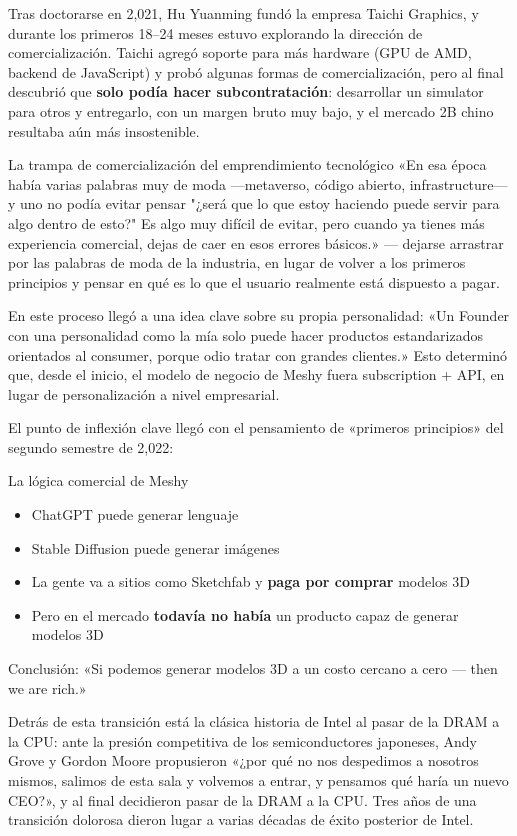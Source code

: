\documentclass[a4paper]{article}
\begin{document}
Tras doctorarse en 2,021, Hu Yuanming fundó la empresa Taichi Graphics, y durante los primeros 18--24 meses estuvo explorando la dirección de comercialización. Taichi agregó soporte para más hardware (GPU de AMD, backend de JavaScript) y probó algunas formas de comercialización, pero al final descubrió que \textbf{solo podía hacer subcontratación}: desarrollar un simulator para otros y entregarlo, con un margen bruto muy bajo, y el mercado 2B chino resultaba aún más insostenible.

\begin{warningbox}{La trampa de comercialización del emprendimiento tecnológico}
«En esa época había varias palabras muy de moda —metaverso, código abierto, infrastructure— y uno no podía evitar pensar "¿será que lo que estoy haciendo puede servir para algo dentro de esto?" Es algo muy difícil de evitar, pero cuando ya tienes más experiencia comercial, dejas de caer en esos errores básicos.» — dejarse arrastrar por las palabras de moda de la industria, en lugar de volver a los primeros principios y pensar en qué es lo que el usuario realmente está dispuesto a pagar.
\end{warningbox}

En este proceso llegó a una idea clave sobre su propia personalidad: «Un Founder con una personalidad como la mía solo puede hacer productos estandarizados orientados al consumer, porque odio tratar con grandes clientes.» Esto determinó que, desde el inicio, el modelo de negocio de Meshy fuera subscription + API, en lugar de personalización a nivel empresarial.

El punto de inflexión clave llegó con el pensamiento de «primeros principios» del segundo semestre de 2,022:

\begin{importantbox}{La lógica comercial de Meshy}
\begin{itemize}
\item ChatGPT puede generar lenguaje
\item Stable Diffusion puede generar imágenes
\item La gente va a sitios como Sketchfab y \textbf{paga por comprar} modelos 3D
\item Pero en el mercado \textbf{todavía no había} un producto capaz de generar modelos 3D
\end{itemize}
Conclusión: «Si podemos generar modelos 3D a un costo cercano a cero — then we are rich.»
\end{importantbox}

Detrás de esta transición está la clásica historia de Intel al pasar de la DRAM a la CPU: ante la presión competitiva de los semiconductores japoneses, Andy Grove y Gordon Moore propusieron «¿por qué no nos despedimos a nosotros mismos, salimos de esta sala y volvemos a entrar, y pensamos qué haría un nuevo CEO?», y al final decidieron pasar de la DRAM a la CPU. Tres años de una transición dolorosa dieron lugar a varias décadas de éxito posterior de Intel.
\end{document}
